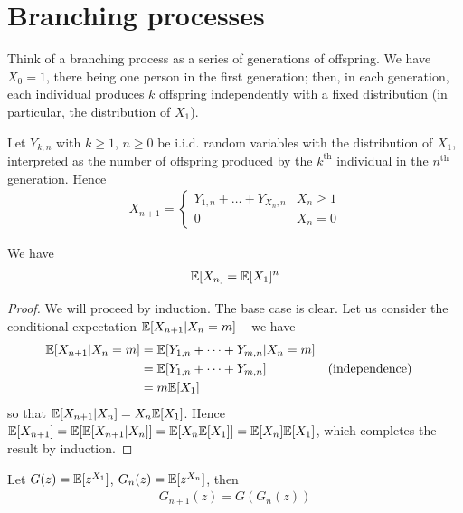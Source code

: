 \documentclass{../template/note}
\begin{document}
    \section{Branching processes}
    
    Think of a branching process as a series of generations of offspring. We have \(X_0 = 1\), there being one person in the first generation; then, in each generation, each individual produces \(k\) offspring independently with a fixed distribution (in particular, the distribution of \(X_1\)).

    Let \(Y_{k,n}\) with \(k \geq 1\), \(n \geq 0\) be i.i.d. random variables with the distribution of \(X_1\), interpreted as the number of offspring produced by the \(k^\text{th}\) individual in the \(n^\text{th}\) generation. Hence
    \begin{align*}
        X_{n+1} = \begin{cases}
            Y_{1, n} + \dots + Y_{X_n, n} & X_n \geq 1 \\
            0 & X_n = 0
        \end{cases}
    \end{align*}
    
    \begin{proposition}
        \label{expected-branching}
        We have
        \begin{align*}
            \mathbb E[X_n] = \mathbb E[X_1]^n
        \end{align*}
    \end{proposition}
    
    \begin{proof}
        We will proceed by induction. The base case is clear. Let us consider the conditional expectation \(\mathbb E[X_{n+1} | X_n = m]\) -- we have
        \begin{align*}
            \mathbb E[X_{n+1} | X_n = m] &= \mathbb E[Y_{1,n} + \dots + Y_{m,n} | X_n = m] \\
            &= \mathbb E[Y_{1,n} + \dots + Y_{m,n}] && \text{(independence)} \\
            &= m\mathbb E[X_1]
        \end{align*}
        so that \(\mathbb E[X_{n+1} | X_n] = X_n\mathbb E[X_1]\). Hence \(\mathbb E[X_{n+1}] = \mathbb E[\mathbb E[X_{n+1} | X_n]] = \mathbb E[X_n\mathbb E[X_1]] = \mathbb E[X_n] \mathbb E[X_1]\), which completes the result by induction.        
    \end{proof}
    
    \begin{proposition}
        Let \(G(z) = \mathbb E[z^{X_1}]\), \(G_n(z) = \mathbb E[z^{X_n}]\), then
        \begin{align*}
            G_{n+1}(z) = G(G_n(z))
        \end{align*}
    \end{proposition}
    
\end{document}
